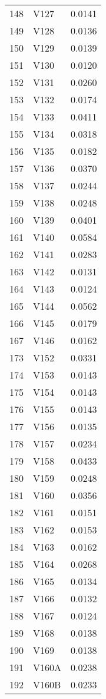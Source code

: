 \documentclass{amsart}
\begin{document}
\begin{longtable}{rlr}
  148 & V127 & 0.0141 \\ 
  149 & V128 & 0.0136 \\ 
  150 & V129 & 0.0139 \\ 
  151 & V130 & 0.0120 \\ 
  152 & V131 & 0.0260 \\ 
  153 & V132 & 0.0174 \\ 
  154 & V133 & 0.0411 \\ 
  155 & V134 & 0.0318 \\ 
  156 & V135 & 0.0182 \\ 
  157 & V136 & 0.0370 \\ 
  158 & V137 & 0.0244 \\ 
  159 & V138 & 0.0248 \\ 
  160 & V139 & 0.0401 \\ 
  161 & V140 & 0.0584 \\ 
  162 & V141 & 0.0283 \\ 
  163 & V142 & 0.0131 \\ 
  164 & V143 & 0.0124 \\ 
  165 & V144 & 0.0562 \\ 
  166 & V145 & 0.0179 \\ 
  167 & V146 & 0.0162 \\ 
  173 & V152 & 0.0331 \\ 
  174 & V153 & 0.0143 \\ 
  175 & V154 & 0.0143 \\ 
  176 & V155 & 0.0143 \\ 
  177 & V156 & 0.0135 \\ 
  178 & V157 & 0.0234 \\ 
  179 & V158 & 0.0433 \\ 
  180 & V159 & 0.0248 \\ 
  181 & V160 & 0.0356 \\ 
  182 & V161 & 0.0151 \\ 
  183 & V162 & 0.0153 \\ 
  184 & V163 & 0.0162 \\ 
  185 & V164 & 0.0268 \\ 
  186 & V165 & 0.0134 \\ 
  187 & V166 & 0.0132 \\ 
  188 & V167 & 0.0124 \\ 
  189 & V168 & 0.0138 \\ 
  190 & V169 & 0.0138 \\ 
  191 & V160A & 0.0238 \\ 
  192 & V160B & 0.0233 \\ 

\end{longtable}
\end{document}
